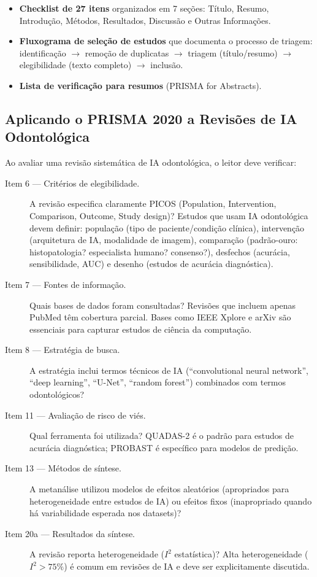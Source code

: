 \begin{itemize}
    \item \textbf{Checklist de 27 itens} organizados em 7 seções: Título, Resumo, Introdução, Métodos, Resultados, Discussão e Outras Informações.
    \item \textbf{Fluxograma de seleção de estudos} que documenta o processo de triagem: identificação $\rightarrow$ remoção de duplicatas $\rightarrow$ triagem (título/resumo) $\rightarrow$ elegibilidade (texto completo) $\rightarrow$ inclusão.
    \item \textbf{Lista de verificação para resumos} (PRISMA for Abstracts).
\end{itemize}

\subsection{Aplicando o PRISMA 2020 a Revisões de IA Odontológica}

Ao avaliar uma revisão sistemática de IA odontológica, o leitor deve verificar:

\begin{description}
    \item[Item 6 — Critérios de elegibilidade.] A revisão especifica claramente PICOS (Population, Intervention, Comparison, Outcome, Study design)? Estudos que usam IA odontológica devem definir: população (tipo de paciente/condição clínica), intervenção (arquitetura de IA, modalidade de imagem), comparação (padrão-ouro: histopatologia? especialista humano? consenso?), desfechos (acurácia, sensibilidade, AUC) e desenho (estudos de acurácia diagnóstica).
    \item[Item 7 — Fontes de informação.] Quais bases de dados foram consultadas? Revisões que incluem apenas PubMed têm cobertura parcial. Bases como IEEE Xplore e arXiv são essenciais para capturar estudos de ciência da computação.
    \item[Item 8 — Estratégia de busca.] A estratégia inclui termos técnicos de IA (``convolutional neural network'', ``deep learning'', ``U-Net'', ``random forest'') combinados com termos odontológicos?
    \item[Item 11 — Avaliação de risco de viés.] Qual ferramenta foi utilizada? QUADAS-2  é o padrão para estudos de acurácia diagnóstica; PROBAST  é específico para modelos de predição.
    \item[Item 13 — Métodos de síntese.] A metanálise utilizou modelos de efeitos aleatórios (apropriados para heterogeneidade entre estudos de IA) ou efeitos fixos (inapropriado quando há variabilidade esperada nos datasets)?
    \item[Item 20a — Resultados da síntese.] A revisão reporta heterogeneidade ($I^2$ estatística)? Alta heterogeneidade ($I^2 > 75\%$) é comum em revisões de IA e deve ser explicitamente discutida.
\end{description}

